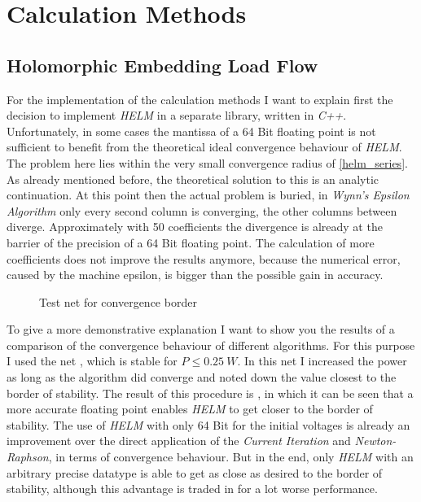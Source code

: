 \section{Calculation Methods}
\label{sec:implementation_calculation_methods}

\subsection{Holomorphic Embedding Load Flow}
For the implementation of the calculation methods I want to explain first the decision to implement \emph{HELM} in a separate library, written in \emph{C++}. Unfortunately, in some cases the mantissa of a 64 Bit floating point is not sufficient to benefit from the theoretical ideal convergence behaviour of \emph{HELM}. The problem here lies within the very small convergence radius of \eqref{helm_series}. As already mentioned before, the theoretical solution to this is an analytic continuation. At this point then the actual problem is buried, in \emph{Wynn's Epsilon Algorithm} only every second column is converging, the other columns between diverge. Approximately with 50 coefficients the divergence is already at the barrier of the precision of a 64 Bit floating point. The calculation of more coefficients does not improve the results anymore, because the numerical error, caused by the machine epsilon, is bigger than the possible gain in accuracy.

\begin{figure}
	\centering
	
	\caption{Test net for convergence border}
	\label{fig:convergence_border_net}
\end{figure}

To give a more demonstrative explanation I want to show you the results of a comparison of the convergence behaviour of different algorithms. For this purpose I used the net , which is stable for $P \le \SI{0.25}{W}$. In this net I increased the power as long as the algorithm did converge and noted down the value closest to the border of stability. The result of this procedure is , in which it can be seen that a more accurate floating point enables \emph{HELM} to get closer to the border of stability. The use of \emph{HELM} with only 64 Bit for the initial voltages is already an improvement over the direct application of the \emph{Current Iteration} and \emph{Newton-Raphson}, in terms of convergence behaviour. But in the end, only \emph{HELM} with an arbitrary precise datatype is able to get as close as desired to the border of stability, although this advantage is traded in for a lot worse performance.

